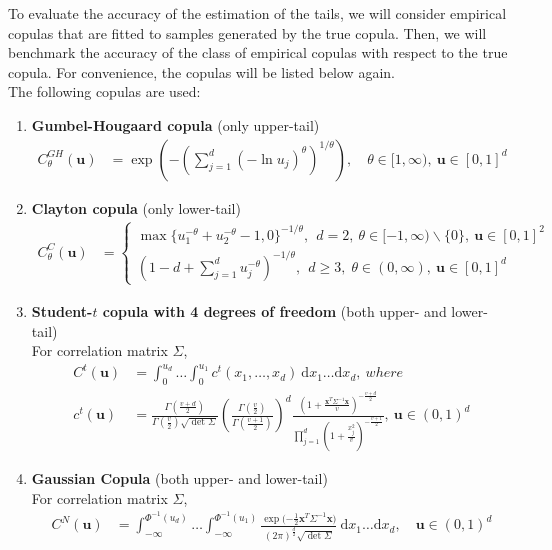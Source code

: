 \documentclass[12pt]{report}
\newcommand{\1}{\mathbf{1}}
\begin{document}
\begin{flushleft}
To evaluate the accuracy of the estimation of the tails, we will consider empirical copulas that are fitted to samples generated by the true copula. Then, we will benchmark the accuracy of the class of empirical copulas with respect to the true copula. For convenience, the copulas will be listed below again. \\
\vspace{0.5cm}
The following copulas are used:
\begin{enumerate}
\item \textbf{Gumbel-Hougaard copula} (only upper-tail) 
\begin{align*}
C^{GH}_{\theta}(\boldsymbol{u}) &= \exp \left( -\left( \sum\limits_{j = 1}^{d} (- \ln u_{j})^{\theta}\right)^{1/\theta} \right), \quad \theta \in [1,\infty), \: \boldsymbol{u} \in [0,1]^{d}
\end{align*}
\item \textbf{Clayton copula} (only lower-tail) 
\begin{align*}
C^{C}_{\theta}(\boldsymbol{u}) &= \left\{
\begin{array}{ll} 
\max \{ u_{1}^{-\theta} + u_{2}^{-\theta} - 1, 0 \}^{-1/\theta}, \: \: d = 2, \: \theta \in [-1,\infty) \backslash \{ 0 \}, \: \boldsymbol{u} \in [0,1]^{2} \\
(1 - d + \sum_{j = 1}^{d} u^{- \theta}_{j} )^{-1/\theta}, \: \: d \ge 3, \; \theta \in (0,\infty), \: \boldsymbol{u} \in [0,1]^{d}
\end{array} 
\right.
\end{align*}
\item \textbf{Student-$t$ copula with 4 degrees of freedom} (both upper- and lower-tail)\\
For correlation matrix $\Sigma$,
\begin{align*}
C^{t}(\boldsymbol{u}) &= \int_{0}^{u_{d}} \dots \int_{0}^{u_{1}} c^{t}(x_{1}, \dots, x_{d}) \: \mathrm{d}x_{1} \dots \mathrm{d}x_{d}, \: where \\
 c^{t}(\boldsymbol{u}) &= \frac{\Gamma(\frac{v+d}{2})}{\Gamma(\frac{v}{2})\sqrt{\det \Sigma}} \left( \frac{\Gamma(\frac{v}{2})}{\Gamma(\frac{v+1}{2})} \right)^{d} \frac{ (1 + \frac{\boldsymbol{x}^{T}\Sigma^{-1}\boldsymbol{x}}{v})^{-\frac{v+d}{2}}}{\prod_{j = 1}^{d} (1 + \frac{x_{j}^{2}}{v})^{-\frac{v+1}{2}}} , \: \boldsymbol{u} \in (0,1)^{d}
\end{align*}
\newpage
\item \textbf{Gaussian Copula} (both upper- and lower-tail)\\
For correlation matrix $\Sigma$,
\begin{align*}
C^{N}(\boldsymbol{u}) &= \int_{-\infty}^{\Phi^{-1}(u_{d})} \dots \int_{-\infty}^{\Phi^{-1}(u_{1})} \frac{\exp{(-\frac{1}{2}\boldsymbol{x}^{T}\Sigma^{-1}\boldsymbol{x}})}{(2\pi)^{\frac{d}{2}}\sqrt{\det \Sigma}} \: \mathrm{d}x_{1} \dots \mathrm{d}x_{d}, \quad \boldsymbol{u} \in (0,1)^{d}
\end{align*}
\end{enumerate}


\end{flushleft}
\end{document}
